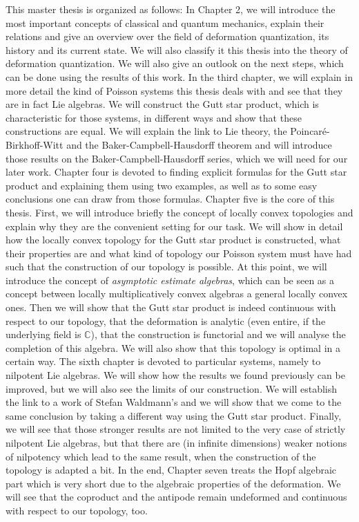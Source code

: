 This master thesis is organized as follows: In Chapter 2, we will
introduce the most important concepts of classical and quantum mechanics, 
explain their relations and give an overview over the field of deformation 
quantization, its history and its current state. We will also classify it this 
thesis into the theory of deformation quantization. We will also give an outlook 
on the next steps, which can be done using the results of this work.
In the third chapter, we will explain in more detail the kind of Poisson 
systems this thesis deals with and see that they are in fact Lie algebras. We 
will construct the Gutt star product, which is characteristic for those 
systems, in different ways and show that these constructions are equal. We will 
explain the link to Lie theory, the Poincar\'e-Birkhoff-Witt and the 
Baker-Campbell-Hausdorff theorem and will introduce those results on the 
Baker-Campbell-Hausdorff series, which we will need for our later work.
Chapter four is devoted to finding explicit formulas for the Gutt star 
product and explaining them using two examples, as well as to some easy 
conclusions one can draw from those formulas.
Chapter five is the core of this thesis. First, we will introduce briefly the 
concept of locally convex topologies and explain why they are the convenient 
setting for our task. We will show in detail how the locally convex topology for 
the Gutt star product is constructed, what their properties are and what kind of 
topology our Poisson system must have had such that the construction of our 
topology is possible. At this point, we will introduce the concept of 
\emph{asymptotic estimate algebras}, 
which can be seen as a concept between locally multiplicatively convex algebras 
a general locally convex ones. Then we will show that the Gutt star product is 
indeed continuous with respect to our topology, that the deformation is 
analytic (even entire, if the underlying field is $\mathbb{C}$), that the 
construction is functorial and we will analyse the completion of this algebra. 
We will also show that this topology is optimal in a certain way.
The sixth chapter is devoted to particular systems, namely to nilpotent Lie 
algebras. We will show how the results we found previously can be improved, 
but we will also see the limits of our construction. We will establish 
the link to a work of Stefan Waldmann's and we will show that we come to the 
same conclusion by taking a different way using the Gutt star product. Finally, 
we will see that those stronger results are not limited to the very case of 
strictly nilpotent Lie algebras, but that there are (in infinite dimensions) 
weaker notions of nilpotency which lead to the same result, when the 
construction of the topology is adapted a bit.
In the end, Chapter seven treats the Hopf algebraic part which is very short 
due to the algebraic properties of the deformation. We will see that 
the coproduct and the antipode remain undeformed and continuous with respect 
to our topology, too.


